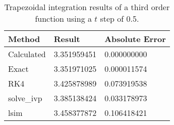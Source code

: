 \begin{singlespace}
\begin{table}[H]
	\centering
	\begin{tabular}{@{} l l l  @{}} 	
		\toprule %
		\footnotesize %
		\raggedright %
		Method	&		Result & Absolute Error		\\
		\midrule		
%
Calculated& 	3.351959451&	0.000000000\\
Exact& 	3.351971025 &	0.000011574 \\
RK4& 	3.425878989&	0.073919538\\
solve\_ivp& 	3.385138424&	0.033178973\\
lsim&	3.458377872	&0.106418421\\
%
		\bottomrule
	\end{tabular}
	\caption{Trapezoidal integration results of a third order function using a $t$ step of 0.5.}
	\label{tab: trap third order res}
\end{table}
\end{singlespace}
	
	